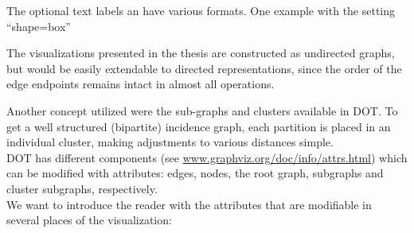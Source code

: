 \documentclass[a4paper, 12pt, bibliography=totoc]{scrartcl}
\begin{document}
The optional text labels an have various formats. One example with the setting ``shape=box''

The visualizations presented in the thesis are constructed as undirected graphs, but would be easily extendable to directed representations, since the order of the edge endpoints remains intact in almost all operations.

Another concept utilized were the sub-graphs and clusters available in DOT.
To get a well structured (bipartite) incidence graph, each partition is placed in an individual cluster, making adjustments to various distances simple.\\


DOT has different components (see \url{www.graphviz.org/doc/info/attrs.html}) which can be modified with attributes: edges, nodes, the root graph, subgraphs and cluster subgraphs, respectively.\\


We want to introduce the reader with the attributes that are modifiable in several places of the visualization:
\end{document}
